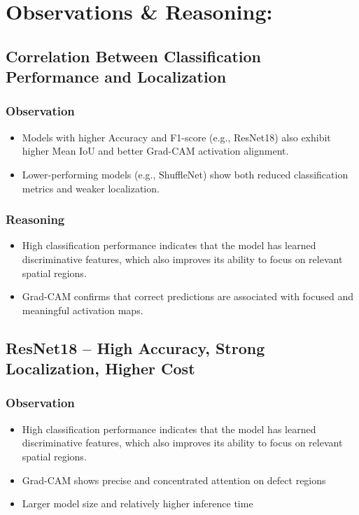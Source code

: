 \section{Observations \& Reasoning:}


\subsection{Correlation Between Classification Performance and Localization}

\subsubsection{Observation}
\begin{itemize}
\item Models with higher Accuracy and F1-score (e.g., ResNet18) also exhibit higher Mean IoU and better Grad-CAM activation alignment.
\item Lower-performing models (e.g., ShuffleNet) show both reduced classification metrics and weaker localization.
\end{itemize}

\subsubsection{Reasoning}
\begin{itemize}

\item High classification performance indicates that the model has learned discriminative features, which also improves its ability to focus on relevant spatial regions.
\item Grad-CAM confirms that correct predictions are associated with focused and meaningful activation maps.
\end{itemize}

\subsection{ResNet18 – High Accuracy, Strong Localization, Higher Cost}
\subsubsection{Observation}
\begin{itemize}
\item High classification performance indicates that the model has learned discriminative features, which also improves its ability to focus on relevant spatial regions.
\item Grad-CAM shows precise and concentrated attention on defect regions
\item Larger model size and relatively higher inference time
\end{itemize}


